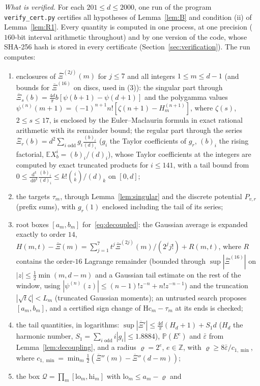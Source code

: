 \documentclass[11pt]{amsart}
\theoremstyle{definition}
\theoremstyle{remark}
\numberwithin{equation}{section}
\newcommand{\Z}{\mathbb{Z}}
\newcommand{\E}{\mathbb{E}}
\renewcommand{\Pr}{\mathbb{P}}
\newcommand{\Xb}{\overline{\Xi}}
\newcommand{\dd}{\,\mathrm{d}}
\begin{document}
\emph{What is verified.} For each $201\le d\le2000$, one run of the program \texttt{verify\_cert.py} certifies all
hypotheses of Lemma~\ref{lem:B} and condition (ii) of Lemma~\ref{lem:R1}. Every quantity is computed in one process, at
one precision ($160$-bit interval arithmetic throughout) and by one version of the code, whose SHA-256 hash is stored in
every certificate (Section~\ref{sec:verification}). The run computes:
\begin{enumerate}
\item enclosures of $\Xb^{(2j)}(m)$ for $j\le7$ and all integers $1\le m\le d-1$ (and bounds for $\Xb^{(16)}$ on discs, used
in (3)): the singular part through $\Xb_s(b)=\frac{4d}\pi b[\psi(b+1)-\psi(d+1)]$ and the polygamma values
$\psi^{(n)}(m+1)=(-1)^{n+1}n![\zeta(n+1)-H^{(n+1)}_m]$, where $\zeta(s)$, $2\le s\le17$, is enclosed by the
Euler--Maclaurin formula in exact rational arithmetic with its remainder bound; the regular part through the series
$\Xb_r(b)=d^2\sum_{i\text{ odd}}g_i\frac{(b)_i}{(d)_i}$ ($g_i$ the Taylor coefficients of $g_r$, $(b)_i$ the rising
factorial, $\E X_b^i=(b)_i/(d)_i$), whose Taylor coefficients at the integers are computed by exact truncated products for
$i\le141$, with a tail bound from $0\le\frac{\dd^k}{\dd b^k}\frac{(b)_i}{(d)_i}\le k!\binom ik/(d)_k$ on $[0,d]$;
\item the targets $\tau_m$, through Lemma~\ref{lem:singular} and the discrete potential $P_{v,r}$ (prefix sums), with
$g_r(1)$ enclosed including the tail of its series;
\item root boxes $[a_m,b_m]$ for~\eqref{eq:decoupled}: the Gaussian average is expanded exactly to order $14$,
$H(m,t)-\Xb(m)=\sum_{j=1}^7t^j\Xb^{(2j)}(m)/(2^jj!)+R(m,t)$, where $R$ contains the order-$16$ Lagrange remainder (bounded
through $\sup|\Xb^{(16)}|$ on $|z|\le\frac12\min(m,d-m)$ and a Gaussian tail estimate on the rest of the window, using
$|\psi^{(n)}(z)|\le(n-1)!z^{-n}+n!z^{-n-1}$) and the truncation $|\sqrt t\zeta|<L_m$ (truncated Gaussian moments); an
untrusted search proposes $[a_m,b_m]$, and a certified sign change of $\mathrm{Hc}_m-\tau_m$ at its ends is checked;
\item the tail quantities, in logarithms: $\sup|\Xb'|\le\frac{4d}\pi(H_d+1)+S_1d$ ($H_d$ the harmonic number,
$S_1=\sum_{i\text{ odd}}i|g_i|\le1.8884$), $\Pr(E^c)$ and $\bar\varepsilon$ from Lemma~\ref{lem:decoupling}, and a
radius $\varrho=2^{e}$, $e\in\Z$, with $\varrho\ge8\bar\varepsilon/c_{1,\min}$, where
$c_{1,\min}=\min_m\frac12(\Xb''(m)-\Xb''(d-m))$;
\item the box $\mathcal Q=\prod_m[\mathrm{lo}_m,\mathrm{hi}_m]$ with $\mathrm{lo}_m\le a_m-\varrho$ and

\end{enumerate}
\end{document}
